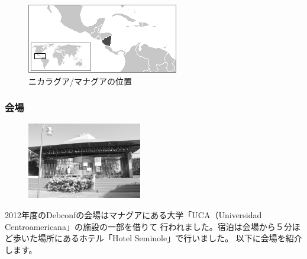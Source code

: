 \documentclass[mingoth,a4paper]{jsarticle}
\begin{document}
\begin{figure}[ht]
\begin{center}
\includegraphics[width=0.8\hsize]{image201208/debconf12_LocationNicaragua_mono.png}
\caption{ニカラグア/マナグアの位置}
\end{center}
\end{figure}

\subsubsection{会場}

\begin{figure}
  \includegraphics[width=5cm]{image201208/debconf12_mainentry_mono.jpg}
\end{figure}

2012年度のDebconfの会場はマナグアにある大学「UCA（Universidad Centroamericana」の施設の一部を借りて
行われました。宿泊は会場から５分ほど歩いた場所にあるホテル「Hotel Seminole」で行いました。
以下に会場を紹介します。
\\
\end{document}

